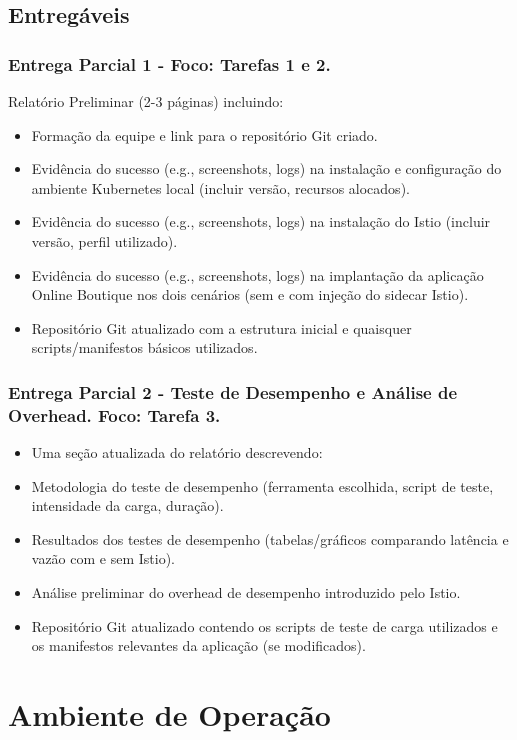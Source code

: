 \documentclass[12pt,a4paper]{report}
\begin{document}
\section{Entregáveis}
\subsection{Entrega Parcial 1 - Foco: Tarefas 1 e 2.} 
Relatório Preliminar (2-3 páginas) incluindo:
\begin{itemize}
    \item Formação da equipe e link para o repositório Git criado.
    \item Evidência do sucesso (e.g., screenshots, logs) na instalação e configuração do ambiente Kubernetes local (incluir versão, recursos alocados).
    \item Evidência do sucesso (e.g., screenshots, logs) na instalação do Istio (incluir versão, perfil utilizado).
    \item Evidência do sucesso (e.g., screenshots, logs) na implantação da aplicação Online Boutique nos dois cenários (sem e com injeção do sidecar Istio).
    \item Repositório Git atualizado com a estrutura inicial e quaisquer scripts/manifestos básicos utilizados.
\end{itemize}
    
\subsection{Entrega Parcial 2 - Teste de Desempenho e Análise de Overhead. Foco: Tarefa 3.} 
\begin{itemize}
    \item Uma seção atualizada do relatório descrevendo:
    \item Metodologia do teste de desempenho (ferramenta escolhida, script de teste, intensidade da carga, duração).
    \item Resultados dos testes de desempenho (tabelas/gráficos comparando latência e vazão com e sem Istio).
    \item Análise preliminar do overhead de desempenho introduzido pelo Istio.
    \item Repositório Git atualizado contendo os scripts de teste de carga utilizados e os manifestos relevantes da aplicação (se modificados).
\end{itemize}      

\chapter{Ambiente de Operação}
\end{document}

